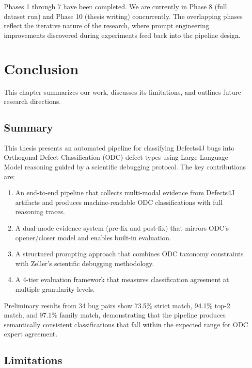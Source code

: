 \documentclass{iutbscthesis}
\begin{document}
Phases 1 through 7 have been completed. We are currently in Phase 8 (full dataset run) and Phase 10 (thesis writing) concurrently. The overlapping phases reflect the iterative nature of the research, where prompt engineering improvements discovered during experiments feed back into the pipeline design.


\chapter{Conclusion}

This chapter summarizes our work, discusses its limitations, and outlines future research directions.

\section{Summary}

This thesis presents an automated pipeline for classifying Defects4J bugs into Orthogonal Defect Classification (ODC) defect types using Large Language Model reasoning guided by a scientific debugging protocol. The key contributions are:

\begin{enumerate}
    \item An end-to-end pipeline that collects multi-modal evidence from Defects4J artifacts and produces machine-readable ODC classifications with full reasoning traces.
    \item A dual-mode evidence system (pre-fix and post-fix) that mirrors ODC's opener/closer model and enables built-in evaluation.
    \item A structured prompting approach that combines ODC taxonomy constraints with Zeller's scientific debugging methodology.
    \item A 4-tier evaluation framework that measures classification agreement at multiple granularity levels.
\end{enumerate}

Preliminary results from 34 bug pairs show 73.5\% strict match, 94.1\% top-2 match, and 97.1\% family match, demonstrating that the pipeline produces semantically consistent classifications that fall within the expected range for ODC expert agreement.

\section{Limitations}
\end{document}
